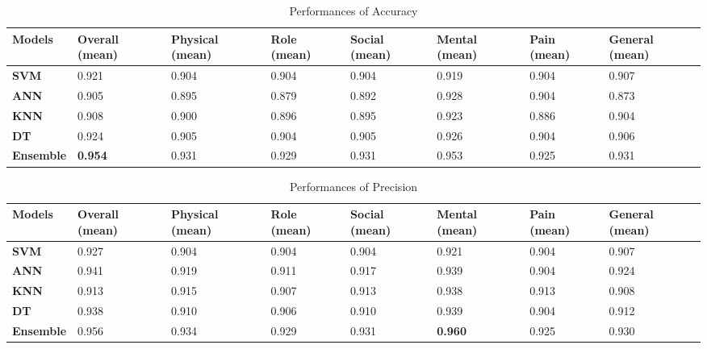 \documentclass[10pt,journal,compsoc]{IEEEtran}
\begin{document}
\begin{table}[ht]
\begin{adjustwidth}{-1.5cm}{}
\begin{tabular}{|C{2cm}|C{1.5cm}|C{2cm}|C{1.5cm}|C{1.5cm}|C{1.5cm}|C{1.5cm}|C{2cm}|}
\hline
{} 
{\color[HTML]{333333} \textbf{Models}} & {\color[HTML]{333333} \textbf{Overall (mean)}} & {\color[HTML]{333333} \textbf{Physical (mean)}} & {\color[HTML]{333333} \textbf{Role (mean)}} &{\color[HTML]{333333} \textbf{Social (mean)}} & {\color[HTML]{333333} \textbf{Mental (mean)}} & {\color[HTML]{333333} \textbf{Pain (mean)}} & {\color[HTML]{333333} \textbf{General (mean)}} \\ \hline
{} 
\textbf{SVM} & 0.921  &0.904 & 0.904 & 0.904 & 0.919 & 0.904  & 0.907  \\ \hline
{} 
\textbf{ANN} & 0.905 & 0.895 & 0.879 & 0.892 & 0.928 & 0.904 & 0.873 \\ \hline
{} 
\textbf{KNN} & 0.908  & 0.900 & 0.896 & 0.895 & 0.923 & 0.886 & 0.904 \\ \hline
{} 
\textbf{DT} & 0.924 & 0.905 & 0.904  & 0.905 & 0.926 & 0.904 & 0.906 \\ \hline
{} 
\textbf{Ensemble} & \textbf{0.954} & 0.931 & 0.929  & 0.931  & 0.953 & 0.925 & 0.931  \\ \hline
\end{tabular}
\caption{Performances of Accuracy}
\label{Accuracy}
\end{adjustwidth}
\end{table}
\begin{table}[ht]
\begin{adjustwidth}{-1.5cm}{}
\begin{tabular}{|C{2cm}|C{1.5cm}|C{2cm}|C{1.5cm}|C{1.5cm}|C{1.5cm}|C{1.5cm}|C{2cm}|}
\hline
{} 
{\color[HTML]{333333} \textbf{Models}} & {\color[HTML]{333333} \textbf{Overall (mean)}} & {\color[HTML]{333333} \textbf{Physical (mean)}} & {\color[HTML]{333333} \textbf{Role (mean)}} &{\color[HTML]{333333} \textbf{Social (mean)}} & {\color[HTML]{333333} \textbf{Mental (mean)}} & {\color[HTML]{333333} \textbf{Pain (mean)}} & {\color[HTML]{333333} \textbf{General (mean)}} \\ \hline
{} 
\textbf{SVM} & 0.927 & 0.904 & 0.904  & 0.904  & 0.921  & 0.904  & 0.907  \\ \hline
{} 
\textbf{ANN}   & 0.941   & 0.919   & 0.911  & 0.917   & 0.939 & 0.904 & 0.924 \\ \hline
{} 
\textbf{KNN} & 0.913 & 0.915 & 0.907  & 0.913 & 0.938 & 0.913  & 0.908  \\ \hline
{} 
\textbf{DT} & 0.938  & 0.910  & 0.906   & 0.910  & 0.939 & 0.904  & 0.912   \\ \hline
{} 
\textbf{Ensemble} & 0.956  & 0.934  & 0.929 & 0.931  & \textbf{0.960}  & 0.925 & 0.930 \\ \hline
\end{tabular}
\caption{Performances of Precision}
\label{Precision}
\end{adjustwidth}
\end{table}
\end{document}
